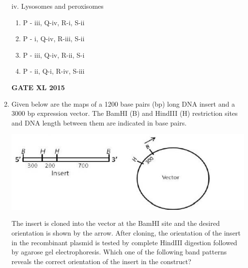 \documentclass[journal,12pt,onecolumn]{IEEEtran}
\begin{document}
\begin{enumerate}
\begin{minipage}{0.5\textwidth}
\begin{flushleft}
iv. Lysosomes and peroxisomes
	\end{flushleft}
\end{minipage}
    \begin{enumerate}
            \item P - iii, Q-iv, R-i, S-ii
            \item P - i, Q-iv, R-iii, S-ii
            \item P - iii, Q-iv, R-ii, S-i
            \item P - ii, Q-i, R-iv, S-iii
    \end{enumerate}
\begin{flushright}\textbf{GATE XL 2015}\end{flushright}
\item Given below are the maps of a 1200 base pairs (bp) long DNA insert and a 3000 bp expression vector. The BamHI (B) and HindIII (H) restriction sites and DNA length between them are indicated in base pairs.

	\includegraphics[width=\textwidth]{45}

The insert is cloned into the vector at the BamHI site and the desired orientation is shown by the arrow. After cloning, the orientation of the insert in the recombinant plasmid is tested by complete HindIII digestion followed by agarose gel electrophoresis. Which one of the following band patterns reveals the correct orientation of the insert in the construct?
    

\end{enumerate}
\end{document}
